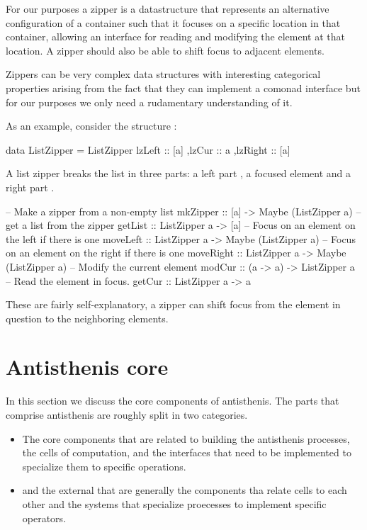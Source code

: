 For our purposes a zipper is a datastructure that represents an
alternative configuration of a container such that it focuses on a
specific location in that container, allowing an interface for reading
and modifying the element at that location. A zipper should also be
able to shift focus to adjacent elements.

Zippers can be very complex data structures with interesting
categorical properties arising from the fact that they can implement a
comonad interface \cite{uustaluComonadicFunctionalAttribute2005} but
for our purposes we only need a rudamentary understanding of it.

As an example, consider the structure :

\begin{haskellcode}
data ListZipper =
  ListZipper
  { lzLeft :: [a]
   ,lzCur :: a
   ,lzRight :: [a]
  }
\end{haskellcode}

A list zipper breaks the list in three parts: a left part , a
focused element  and a right part .

\begin{haskellcode}
-- Make a zipper from a non-empty list
mkZipper :: [a] -> Maybe (ListZipper a)
-- get a list from the zipper
getList :: ListZipper a -> [a]
-- Focus on an element on the left if there is one
moveLeft :: ListZipper a -> Maybe (ListZipper a)
-- Focus on an element on the right if there is one
moveRight :: ListZipper a -> Maybe (ListZipper a)
-- Modify the current element
modCur :: (a -> a) -> ListZipper a
-- Read the element in focus.
getCur :: ListZipper a -> a
\end{haskellcode}

These are fairly self-explanatory, a zipper can shift focus from the
element in question to the neighboring elements.

\section{Antisthenis core}

In this section we discuss the core components of antisthenis. The
parts that comprise antisthenis are roughly split in two
categories.

\begin{itemize}
\item The core components that are related to building the antisthenis
processes, the cells of computation, and the interfaces that need to
be implemented to specialize them to specific operations.
\item and the external that are generally the components tha relate cells
to each other and the systems that specialize proecesses to
implement specific operators.
\end{itemize}

